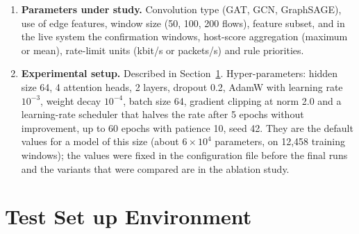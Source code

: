 \begin{enumerate}
	\item \textbf{Parameters under study.} Convolution type (GAT, GCN, GraphSAGE), use of edge features, window size (50, 100, 200 flows), feature subset, and in the live system the confirmation windows, host-score aggregation (maximum or mean), rate-limit units (kbit/s or packets/s) and rule priorities.
	\item \textbf{Experimental setup.} Described in Section~\ref{sec:testenv}. Hyper-parameters: hidden size 64, 4 attention heads, 2 layers, dropout 0.2, AdamW \cite{bib:adam} with learning rate $10^{-3}$, weight decay $10^{-4}$, batch size 64, gradient clipping at norm 2.0 and a learning-rate scheduler that halves the rate after 5 epochs without improvement, up to 60 epochs with patience 10, seed 42. They are the default values for a model of this size (about $6\times10^4$ parameters, on 12,458 training windows); the values were fixed in the configuration file before the final runs and the variants that were compared are in the ablation study.
\end{enumerate}

\section{Test Set up Environment}
\label{sec:testenv}

